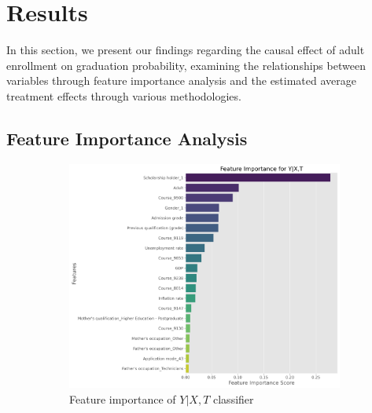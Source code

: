 \documentclass{article}
\begin{document}
\section{Results}

In this section, we present our findings regarding the causal effect of adult enrollment on graduation probability, examining the relationships between variables through feature importance analysis and the estimated average treatment effects through various methodologies.

\subsection{Feature Importance Analysis}

\begin{figure}
    \centering
    \caption{Important features of classifiers}
    \label{fig:feature_importance}
    \begin{subfigure}[b]{0.45\textwidth}
        \centering
        \includegraphics[width=\textwidth]{plots/feature_importance_y_given_xt.png}
        \caption{Feature importance of $Y | X, T$ classifier}
        \label{fig:feature_importance_y_given_xt}
    \end{subfigure}
    \hfill
    \begin{subfigure}[b]{0.45\textwidth}
        \centering

\end{subfigure}
\end{figure}
\end{document}
